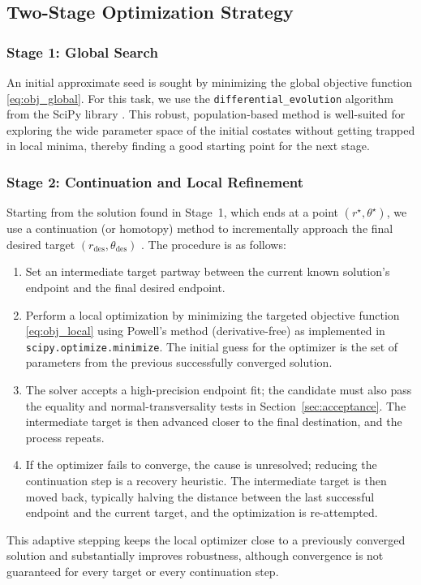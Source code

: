 \documentclass[journal,a4paper]{IEEEtran}
\begin{document}
\subsection{Two-Stage Optimization Strategy}
\subsubsection{Stage 1: Global Search}
An initial approximate seed is sought by minimizing the global objective function \eqref{eq:obj_global}. For this task, we use the \texttt{differential\_evolution} algorithm from the SciPy library \cite{Storn1997}. This robust, population-based method is well-suited for exploring the wide parameter space of the initial costates without getting trapped in local minima, thereby finding a good starting point for the next stage.

\subsubsection{Stage 2: Continuation and Local Refinement}
Starting from the solution found in Stage~1, which ends at a point $(r^\star, \theta^\star)$, we use a continuation (or homotopy) method to incrementally approach the final desired target $(r_\text{des}, \theta_\text{des})$ \cite{Allgower1990}. The procedure is as follows:
\begin{enumerate}
    \item Set an intermediate target partway between the current known solution's endpoint and the final desired endpoint.
    \item Perform a local optimization by minimizing the targeted objective function \eqref{eq:obj_local} using Powell's method \cite{Powell1964} (derivative-free) as implemented in \texttt{scipy.optimize.minimize}. The initial guess for the optimizer is the set of parameters from the previous successfully converged solution.
    \item The solver accepts a high-precision endpoint fit; the candidate must also pass the equality and normal-transversality tests in Section~\ref{sec:acceptance}. The intermediate target is then advanced closer to the final destination, and the process repeats.
    \item If the optimizer fails to converge, the cause is unresolved; reducing the continuation step is a recovery heuristic. The intermediate target is then moved back, typically halving the distance between the last successful endpoint and the current target, and the optimization is re-attempted.
\end{enumerate}
This adaptive stepping keeps the local optimizer close to a previously converged solution and substantially improves robustness, although convergence is not guaranteed for every target or every continuation step.
\end{document}
